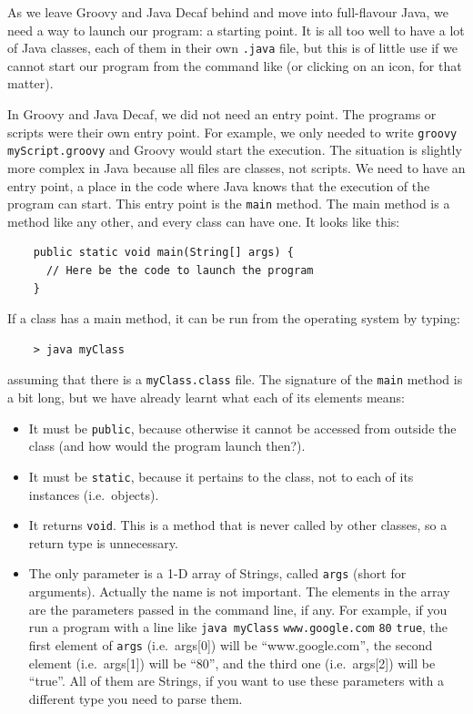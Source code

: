 As we leave Groovy and Java Decaf behind and move into full-flavour Java, we need a
way to launch our program: a starting point. It is all too well to
have a lot of Java classes, each of them in their own \verb+.java+
file, but this is of little use if we cannot start our program from
the command like (or clicking on an icon, for that matter). 

In Groovy and Java Decaf, we did not need an entry point. The programs or scripts
were their own entry point. For example, we only needed to 
write \verb+groovy myScript.groovy+ and Groovy would
start the execution. The situation is slightly more complex in Java
because all files are classes, not scripts. We need to have an entry
point, a place in the code where Java knows that the execution of the
program can start. This entry point is the \verb+main+ method. The
main method is a method like any other, and every class can have
one. It looks like this:

\begin{verbatim}
    public static void main(String[] args) {
      // Here be the code to launch the program
    }
\end{verbatim}

If a class has a main method, it can be run from the operating system
by typing: 

\begin{verbatim}
    > java myClass
\end{verbatim}

assuming that there is a \verb+myClass.class+ file. The 
signature of the \verb+main+ method is a bit long, but we have
already learnt what each of its elements means: 

\begin{itemize}
\item It must be \verb+public+, because otherwise it cannot be
  accessed from outside the class (and how would the program launch
  then?).
\item It must be \verb+static+, because it pertains to the class, not
  to each of its instances (i.e.~objects).
\item It returns \verb+void+. This is a method that is never called by
  other classes, so a return type is unnecessary.
\item The only parameter is a 1-D array of Strings, called \verb+args+
  (short for arguments). Actually the name is not important. The
  elements in the array are the parameters passed in the command line,
  if any. For example, if you run a program with a line like
  \verb+java myClass+ \verb+www.google.com+ \verb+80+ \verb+true+, 
  the first element
  of \verb+args+ (i.e.~args[0]) will be ``www.google.com'', 
  the second element (i.e.~args[1]) will be ``80'', 
  and the third one (i.e.~args[2]) will be ``true''. All of them are
  Strings, if you
  want to use these parameters with a different type you need to parse
  them. 
\end{itemize}

